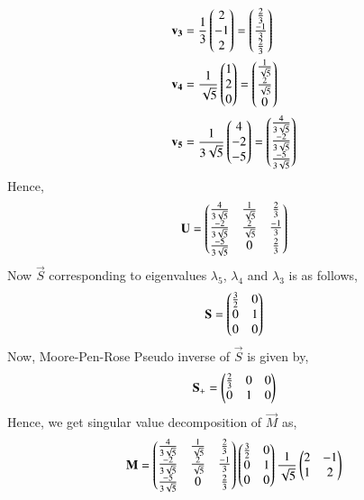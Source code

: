 \documentclass[journal,12pt,twocolumn]{IEEEtran}
\begin{document}
\begin{align}
	& \mathbf{v_3} = \frac{1}{3}\begin{pmatrix}2 \\ -1 \\ 2\end{pmatrix} = \begin{pmatrix}\frac{2}{3} \\ \frac{-1}{3} \\ \frac{2}{3}\end{pmatrix} \\
	& \mathbf{v_4} = \frac{1}{\sqrt{5}}\begin{pmatrix}1 \\ 2 \\ 0\end{pmatrix} = \begin{pmatrix}\frac{1}{\sqrt{5}} \\ \frac{2}{\sqrt{5}} \\ 0\end{pmatrix} \\ 
	& \mathbf{v_5} = \frac{1}{3\sqrt{5}}\begin{pmatrix}4 \\ -2 \\ -5\end{pmatrix} =  \begin{pmatrix}\frac{4}{3\sqrt{5}} \\ \frac{-2}{3\sqrt{5}} \\ \frac{-5}{3\sqrt{5}}\end{pmatrix}
\end{align}
Hence,
\begin{align}
	\mathbf{U} = \begin{pmatrix}\frac{4}{3\sqrt{5}} & \frac{1}{\sqrt{5}} & \frac{2}{3} \\ \frac{-2}{3\sqrt{5}}  & \frac{2}{\sqrt{5}} & \frac{-1}{3} \\ \frac{-5}{3\sqrt{5}}  & 0 & \frac{2}{3} \end{pmatrix} \label{6}
\end{align}
Now $\vec{S}$ corresponding to eigenvalues $\lambda_5$, $\lambda_4$ and $\lambda_3$ is as follows,
\begin{align}
	\mathbf{S} = \begin{pmatrix}\frac{3}{2} & 0 \\ 0 & 1  \\ 0 & 0\end{pmatrix}\label{7}
\end{align}
Now, Moore-Pen-Rose Pseudo inverse of $\vec{S}$ is given by,
\begin{align}
	\mathbf{S_+} = \begin{pmatrix}\frac{2}{3} & 0 & 0 \\ 0 & 1 & 0\end{pmatrix}
\end{align}
Hence, we get singular value decomposition of $\vec{M}$ as,
\begin{align}
\mathbf{M} = \begin{pmatrix}\frac{4}{3\sqrt{5}} & \frac{1}{\sqrt{5}} & \frac{2}{3} \\ \frac{-2}{3\sqrt{5}}  & \frac{2}{\sqrt{5}} & \frac{-1}{3} \\ \frac{-5}{3\sqrt{5}}  & 0 & \frac{2}{3} \end{pmatrix} \begin{pmatrix}\frac{3}{2} & 0 \\ 0 & 1  \\ 0 & 0\end{pmatrix} \frac{1}{\sqrt{5}}\begin{pmatrix}2 & -1 \\ 1 & 2 \end{pmatrix}
\end{align}
\end{document}

